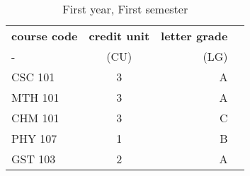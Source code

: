 \documentclass{article}
\begin{document}
\begin{table}[h!]
	\begin{center}
		\caption{First year, First semester}
		\label{tab:table1}
		\begin{tabular}{l|c|r|c}
		\textbf{course code} & \textbf{credit unit} &
		\textbf{letter grade}\\ 
		- & (CU) & (LG)\\
		\hline 
		CSC 101 & 3 & A\\
		MTH 101 & 3 & A\\
		CHM 101 & 3 & C\\
		PHY 107 & 1 & B\\
		GST 103 & 2 & A\\
		
		
		\end{tabular}
	\end{center}
\end{table}
\end{document}
